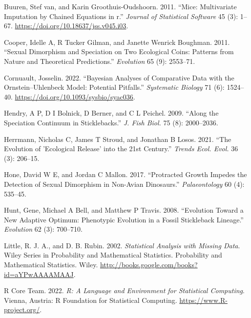 \documentclass[
  12pt,
]{article}
\newlength{\cslhangindent}
\newlength{\cslentryspacingunit} %
\newenvironment{CSLReferences}[2] %
 {%
  \setlength{\parindent}{0pt}
  \ifodd #1
  \let\oldpar\par
  \def\par{\hangindent=\cslhangindent\oldpar}
  \fi
  \setlength{\parskip}{#2\cslentryspacingunit}
 }%
 {}
\begin{document}
\begin{CSLReferences}{1}{0}
\leavevmode{}%
Buuren, Stef van, and Karin Groothuis-Oudshoorn. 2011. {``Mice:
Multivariate Imputation by Chained Equations in r.''} \emph{Journal of
Statistical Software} 45 (3): 1--67.
\url{https://doi.org/10.18637/jss.v045.i03}.

\leavevmode{}%
Cooper, Idelle A, R Tucker Gilman, and Janette Wenrick Boughman. 2011.
{``Sexual Dimorphism and Speciation on Two Ecological Coins: Patterns
from Nature and Theoretical Predictions.''} \emph{Evolution} 65 (9):
2553--71.

\leavevmode{}%
Cornuault, Josselin. 2022. {``{Bayesian Analyses of Comparative Data
with the Ornstein--Uhlenbeck Model: Potential Pitfalls}.''}
\emph{Systematic Biology} 71 (6): 1524--40.
\url{https://doi.org/10.1093/sysbio/syac036}.

\leavevmode{}%
Hendry, A P, D I Bolnick, D Berner, and C L Peichel. 2009. {``Along the
Speciation Continuum in Sticklebacks.''} \emph{J. Fish Biol.} 75 (8):
2000--2036.

\leavevmode{}%
Herrmann, Nicholas C, James T Stroud, and Jonathan B Losos. 2021. {``The
Evolution of 'Ecological Release' into the 21st Century.''} \emph{Trends
Ecol. Evol.} 36 (3): 206--15.

\leavevmode{}%
Hone, David W E, and Jordan C Mallon. 2017. {``Protracted Growth Impedes
the Detection of Sexual Dimorphism in Non-Avian Dinosaurs.''}
\emph{Palaeontology} 60 (4): 535--45.

\leavevmode{}%
Hunt, Gene, Michael A Bell, and Matthew P Travis. 2008. {``Evolution
Toward a New Adaptive Optimum: Phenotypic Evolution in a Fossil
Stickleback Lineage.''} \emph{Evolution} 62 (3): 700--710.

\leavevmode{}%
Little, R. J. A., and D. B. Rubin. 2002. \emph{Statistical Analysis with
Missing Data}. Wiley Series in Probability and Mathematical Statistics.
Probability and Mathematical Statistics. Wiley.
\url{http://books.google.com/books?id=aYPwAAAAMAAJ}.

\leavevmode{}%
R Core Team. 2022. \emph{R: A Language and Environment for Statistical
Computing}. Vienna, Austria: R Foundation for Statistical Computing.
\url{https://www.R-project.org/}.


\end{CSLReferences}
\end{document}
